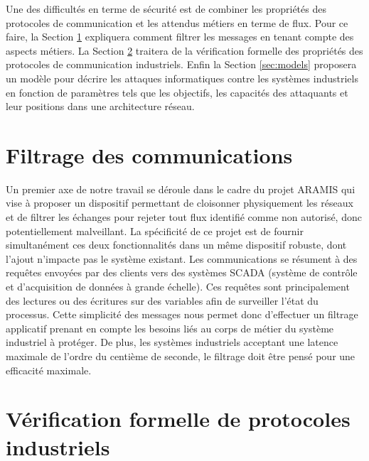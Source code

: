\documentclass{article}
\newcommand{\aramis}{ARAMIS}
\begin{document}
Une des difficultés en terme de sécurité est de combiner les propriétés des
protocoles de communication et les attendus métiers en terme de flux.
Pour ce faire, la Section \ref{sec:aramis} expliquera comment filtrer les
messages en tenant compte des aspects métiers.
La Section \ref{sec:protocols} traitera de la vérification formelle des
propriétés des protocoles de communication industriels.
Enfin la Section \ref{sec:models} proposera un modèle pour décrire les attaques
informatiques contre les systèmes industriels en fonction de paramètres tels que
les objectifs, les capacités des attaquants et leur positions dans une
architecture réseau.

\section{Filtrage des communications}\label{sec:aramis}

Un premier axe de notre travail se déroule dans le cadre du projet \aramis{}
\cite{aramis} qui vise à proposer un dispositif permettant de cloisonner
physiquement les réseaux et de filtrer les échanges pour rejeter tout flux
identifié comme non autorisé, donc potentiellement malveillant.
La spécificité de ce projet est de fournir simultanément ces deux
fonctionnalités dans un même dispositif robuste, dont l'ajout n'impacte pas le
système existant.
Les communications se résument à des requêtes envoyées par des clients vers des
systèmes SCADA (système de contrôle et d'acquisition de données à grande
échelle).
Ces requêtes sont principalement des lectures ou des écritures sur des variables
afin de surveiller l'état du processus.
Cette simplicité des messages nous permet donc d'effectuer un filtrage
applicatif prenant en compte les besoins liés au corps de métier du système
industriel à protéger.
De plus, les systèmes industriels acceptant une latence maximale de l'ordre du
centième de seconde, le filtrage doit être pensé pour une efficacité maximale.

%        

\section{Vérification formelle de protocoles industriels}\label{sec:protocols}
\end{document}
